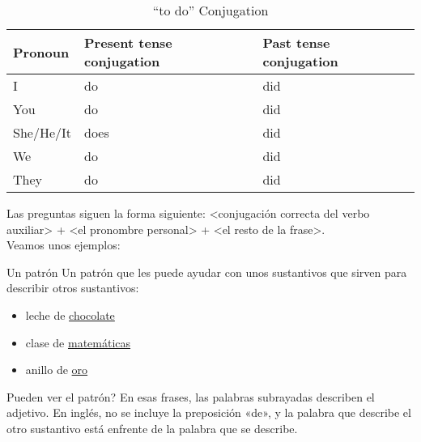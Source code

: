 \begin{table}[H]
	\centering
	\begin{tabular}{lll}
	\toprule
		\textbf{Pronoun} & \textbf{Present tense conjugation} & \textbf{Past tense conjugation}\\
	\midrule
		I & do & did\\
		You & do & did\\
		She/He/It & does & did \\
		We & do & did\\
		They & do & did\\
	\bottomrule
	\end{tabular}
	\caption{``to do'' Conjugation}
\end{table}

Las preguntas siguen la forma siguiente: <conjugaci\'on correcta del verbo auxiliar> + <el pronombre personal> + <el resto de la frase>. \\

Veamos unos ejemplos:


\begin{conf}{Un patr\'on}
	Un patr\'on que les puede ayudar con unos sustantivos que sirven para describir otros sustantivos:
	\begin{itemize}
		\item leche de \underline{chocolate} \arr {}
		\item clase de \underline{matemáticas} \arr {}
		\item anillo de \underline{oro} \arr {}
	\end{itemize}

	\textquestiondown Pueden ver el patr\'on?
	En esas frases, las palabras subrayadas describen el adjetivo.
	En ingl\'es, no se incluye la preposici\'on «de», y la palabra que describe el otro sustantivo está enfrente de
	la palabra que se describe.
\end{conf}
